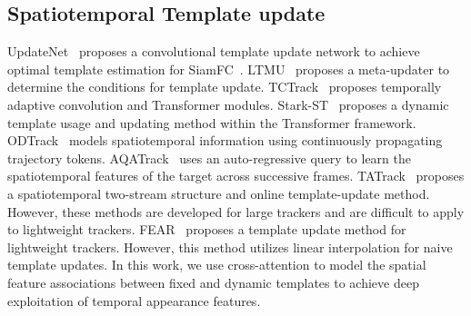 \subsection{Spatiotemporal Template update}

UpdateNet~\cite{updatenet} proposes a convolutional template update network to achieve optimal template estimation for SiamFC~\cite{siamfc}. LTMU~\cite{ltmu} proposes a meta-updater to determine the conditions for template update. TCTrack~\cite{tctrack} proposes temporally adaptive convolution and Transformer modules. Stark-ST~\cite{stark} proposes a dynamic template usage and updating method within the Transformer framework. ODTrack~\cite{odtrack} models spatiotemporal information using continuously propagating trajectory tokens. AQATrack~\cite{aqatrack} uses an auto-regressive query to learn the spatiotemporal features of the target across  successive frames. TATrack~\cite{tatrack} proposes a spatiotemporal two-stream structure and online template-update method. However, these methods are developed for large trackers and are difficult to apply to lightweight trackers. FEAR~\cite{fear} proposes a template update method for lightweight trackers. However, this method utilizes linear interpolation for naive template updates. In this work, we use cross-attention to model the spatial feature associations between fixed and dynamic templates to achieve deep exploitation of temporal appearance features.
